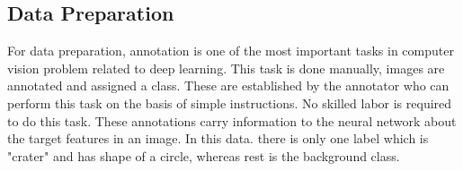 \documentclass[11pt]{article}
\begin{document}

\subsection{Data Preparation}
For data preparation, annotation is one of the most important tasks in computer vision problem related to deep learning. This task is done manually, images are annotated and assigned a class. These are established by the annotator who can perform this task on the basis of simple instructions. No skilled labor is required to do this task. These annotations carry information to the neural network about the target features in an image. In this data. there is only one label which is "crater" and has shape of a circle, whereas rest is the background class.
\end{document}
